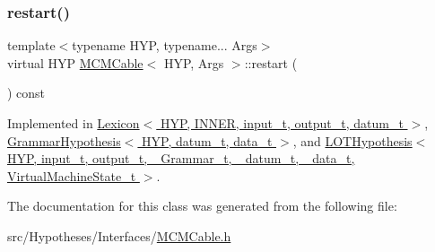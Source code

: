 \mbox{\label{class_m_c_m_cable_a220d6c4ca73e20441c14fa5bd3e090d3}} 
\subsubsection{\texorpdfstring{restart()}{restart()}}
{\footnotesize\ttfamily template$<$typename H\+YP, typename... Args$>$ \\
virtual H\+YP \hyperlink{class_m_c_m_cable}{M\+C\+M\+Cable}$<$ H\+YP, Args $>$\+::restart (\begin{DoxyParamCaption}{ }\end{DoxyParamCaption}) const\hspace{0.3cm}{\ttfamily [pure virtual]}}



Implemented in \hyperlink{class_lexicon_ac8577ba9b4554ebf1852020c617bd7df}{Lexicon$<$ H\+Y\+P, I\+N\+N\+E\+R, input\+\_\+t, output\+\_\+t, datum\+\_\+t $>$}, \hyperlink{class_grammar_hypothesis_aa0d96def3fe7e22a2bbf2c89ba996bcf}{Grammar\+Hypothesis$<$ H\+Y\+P, datum\+\_\+t, data\+\_\+t $>$}, and \hyperlink{class_l_o_t_hypothesis_a0791b7ba0105870a2094877445570b61}{L\+O\+T\+Hypothesis$<$ H\+Y\+P, input\+\_\+t, output\+\_\+t, \+\_\+\+Grammar\+\_\+t, \+\_\+datum\+\_\+t, \+\_\+data\+\_\+t, Virtual\+Machine\+State\+\_\+t $>$}.



The documentation for this class was generated from the following file\+:\begin{DoxyCompactItemize}
\item 
src/\+Hypotheses/\+Interfaces/\hyperlink{_m_c_m_cable_8h}{M\+C\+M\+Cable.\+h}\end{DoxyCompactItemize}
